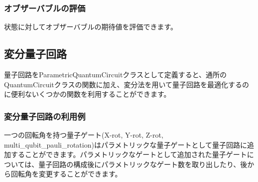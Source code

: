 \subsubsection*{オブザーバブルの評価}

状態に対してオブザーバブルの期待値を評価できます。 
\begin{DoxyCode}{0}
\DoxyCodeLine{}
\DoxyCodeLine{}
\end{DoxyCode}


\subsection*{変分量子回路}

量子回路を\+Parametric\+Quantum\+Circuitクラスとして定義すると、通所の\+Quantum\+Circuitクラスの関数に加え、変分法を用いて量子回路を最適化するのに便利ないくつかの関数を利用することができます。

\subsubsection*{変分量子回路の利用例}

一つの回転角を持つ量子ゲート(X-\/rot, Y-\/rot, Z-\/rot, multi\+\_\+qubit\+\_\+pauli\+\_\+rotation)はパラメトリックな量子ゲートとして量子回路に追加することができます。パラメトリックなゲートとして追加された量子ゲートについては、量子回路の構成後にパラメトリックなゲート数を取り出したり、後から回転角を変更することができます。


